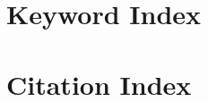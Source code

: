 %
%

%
%
%
%

\chapter{Keyword Index}

\printglossary

%
%
%
%

\chapter{Citation Index}

\printindex

